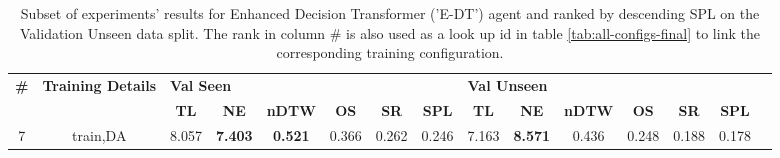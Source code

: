\begin{table}
\centering
\caption{\label{tab:e_dt_dagger}Subset of experiments' results for Enhanced Decision Transformer ('E-DT') agent and ranked by descending SPL on the Validation Unseen data split. The rank in column \# is also used as a look up id in table \ref{tab:all-configs-final} to link the corresponding training configuration.}
\begin{tabular}{@{\hskip3pt}c@{\hskip3pt}c@{\hskip3pt}c@{\hskip3pt}c@{\hskip3pt}c@{\hskip3pt}c@{\hskip3pt}c@{\hskip3pt}c@{\hskip3pt}c@{\hskip3pt}c@{\hskip3pt}c@{\hskip3pt}c@{\hskip3pt}c@{\hskip3pt}c@{\hskip3pt}c}
\toprule
\textbf{\#} & \textbf{Training Details} & \multicolumn{6}{l}{\textbf{Val Seen}} & \multicolumn{6}{l}{\textbf{Val Unseen}} \\
 \textbf{~} &                \textbf{~} &       \textbf{TL} &     \textbf{NE} &   \textbf{nDTW} & \textbf{OS} & \textbf{SR} & \textbf{SPL} &         \textbf{TL} &     \textbf{NE} & \textbf{nDTW} & \textbf{OS} & \textbf{SR} & \textbf{SPL} \\
\midrule
          7 &                  train,DA &             8.057 &  \textbf{7.403} &  \textbf{0.521} &       0.366 &       0.262 &        0.246 &               7.163 &  \textbf{8.571} &         0.436 &       0.248 &       0.188 &        0.178 \\
\bottomrule
\end{tabular}
\end{table}
